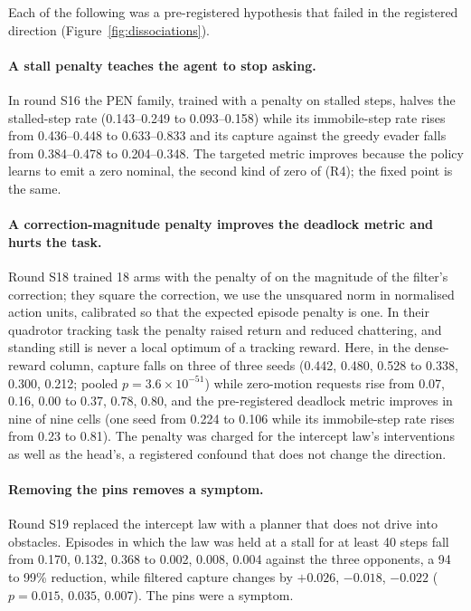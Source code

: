 \documentclass{l4dc2027}
\begin{document}
Each of the following was a pre-registered hypothesis that failed in the registered direction (Figure~\ref{fig:dissociations}).

\paragraph{A stall penalty teaches the agent to stop asking.} In round S16 the PEN family, trained with a penalty on stalled steps, halves the stalled-step rate (0.143--0.249 to 0.093--0.158) while its immobile-step rate rises from 0.436--0.448 to 0.633--0.833 and its capture against the greedy evader falls from 0.384--0.478 to 0.204--0.348. The targeted metric improves because the policy learns to emit a zero nominal, the second kind of zero of (R4); the fixed point is the same.

\paragraph{A correction-magnitude penalty improves the deadlock metric and hurts the task.} Round S18 trained 18 arms with the penalty of \citet{pizarro2025filtering} on the magnitude of the filter's correction; they square the correction, we use the unsquared norm in normalised action units, calibrated so that the expected episode penalty is one. In their quadrotor tracking task the penalty raised return and reduced chattering, and standing still is never a local optimum of a tracking reward. Here, in the dense-reward column, capture falls on three of three seeds (0.442, 0.480, 0.528 to 0.338, 0.300, 0.212; pooled $p = 3.6\times10^{-51}$) while zero-motion requests rise from 0.07, 0.16, 0.00 to 0.37, 0.78, 0.80, and the pre-registered deadlock metric improves in nine of nine cells (one seed from 0.224 to 0.106 while its immobile-step rate rises from 0.23 to 0.81). The penalty was charged for the intercept law's interventions as well as the head's, a registered confound that does not change the direction.

\paragraph{Removing the pins removes a symptom.} Round S19 replaced the intercept law with a planner that does not drive into obstacles. Episodes in which the law was held at a stall for at least 40 steps fall from 0.170, 0.132, 0.368 to 0.002, 0.008, 0.004 against the three opponents, a 94 to 99\% reduction, while filtered capture changes by $+0.026$, $-0.018$, $-0.022$ ($p = 0.015$, $0.035$, $0.007$). The pins were a symptom.
\end{document}
